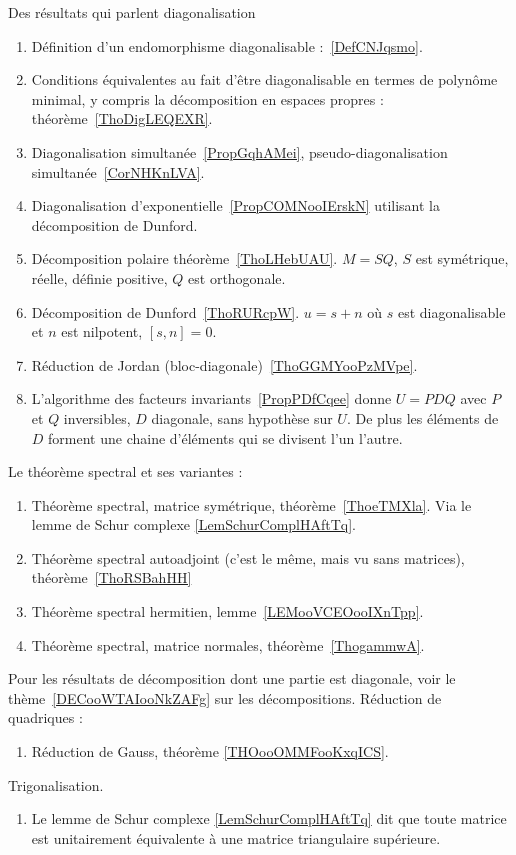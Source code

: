 
	\label{THEMEooDiagonalisation}
Des résultats qui parlent diagonalisation
\begin{enumerate}
	\item
	      Définition d'un endomorphisme diagonalisable :~\ref{DefCNJqsmo}.
	\item
	      Conditions équivalentes au fait d'être diagonalisable en termes de polynôme minimal, y compris la décomposition en espaces propres : théorème~\ref{ThoDigLEQEXR}.
	\item
	      Diagonalisation simultanée~\ref{PropGqhAMei}, pseudo-diagonalisation simultanée~\ref{CorNHKnLVA}.
	\item
	      Diagonalisation d'exponentielle~\ref{PropCOMNooIErskN} utilisant la décomposition de Dunford.
	\item
	      Décomposition polaire théorème~\ref{ThoLHebUAU}. \( M=SQ\), \( S\) est symétrique, réelle, définie positive, \( Q\) est orthogonale.
	\item
	      Décomposition de Dunford~\ref{ThoRURcpW}. \( u=s+n\) où \( s\) est diagonalisable et \( n\) est nilpotent, \( [s,n]=0\).
	\item
	      Réduction de Jordan (bloc-diagonale)~\ref{ThoGGMYooPzMVpe}.
	\item
	      L'algorithme des facteurs invariants~\ref{PropPDfCqee} donne \( U=PDQ\) avec \( P\) et \( Q\) inversibles, \( D\) diagonale, sans hypothèse sur \( U\). De plus les éléments de \( D\) forment une chaine d'éléments qui se divisent l'un l'autre.
\end{enumerate}
Le théorème spectral et ses variantes :
\begin{enumerate}
	\item
	      Théorème spectral, matrice symétrique, théorème~\ref{ThoeTMXla}. Via le lemme de Schur complexe \ref{LemSchurComplHAftTq}.
	\item
	      Théorème spectral autoadjoint (c'est le même, mais vu sans matrices), théorème~\ref{ThoRSBahHH}
	\item
	      Théorème spectral hermitien, lemme~\ref{LEMooVCEOooIXnTpp}.
	\item
	      Théorème spectral, matrice normales, théorème~\ref{ThogammwA}.
\end{enumerate}
Pour les résultats de décomposition dont une partie est diagonale, voir le thème~\ref{DECooWTAIooNkZAFg} sur les décompositions.
Réduction de quadriques :
\begin{enumerate}
	\item
	      Réduction de Gauss, théorème \ref{THOooOMMFooKxqICS}.
\end{enumerate}

Trigonalisation.
\begin{enumerate}
    \item
        Le lemme de Schur complexe \ref{LemSchurComplHAftTq} dit que toute matrice est unitairement équivalente à une matrice triangulaire supérieure.
\end{enumerate}
